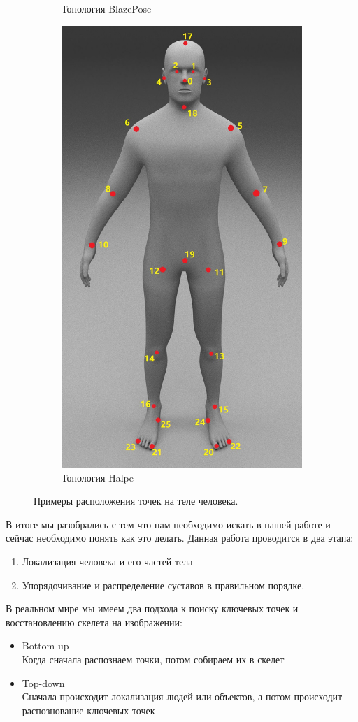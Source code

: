 \begin{figure}[h]
\begin{subfigure}[b]{.3\textwidth}
    \caption{Топология BlazePose }
    \label{fig:BlazePose_topology}
\end{subfigure}
\begin{subfigure}[b]{.3\textwidth}
	\centering
    \includegraphics[height=\textwidth]{./images/Halpe_topology.jpg}
    \caption{Топология Halpe}
    \label{fig:Halpe_topology}
\end{subfigure}
    \caption{Примеры расположения точек на теле человека.}
\end{figure}

В итоге мы разобрались с тем что нам необходимо искать в нашей работе и сейчас необходимо понять как это делать. Данная работа проводится в два этапа: 
\begin{enumerate}
	\item Локализация человека и его частей тела
	\item Упорядочивание и распределение суставов в правильном порядке.
\end{enumerate}

В реальном мире мы имеем два подхода к поиску ключевых точек и восстановлению скелета на изображении:
\begin{itemize}
	\item Bottom-up\\
	Когда сначала распознаем точки,  потом собираем их в скелет
	\item Top-down\\
	Сначала происходит локализация людей или объектов, а потом происходит распознование ключевых точек
\end{itemize}

